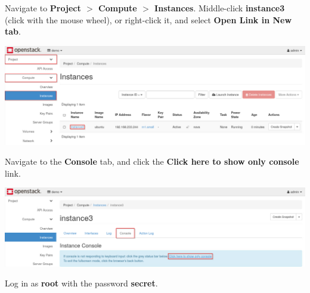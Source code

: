 \documentclass[letterpaper, 12pt]{article}
\begin{document}
\begin{enumerate}
    \begin{labstep}
        Navigate to \textbf{Project $>$ Compute $>$ Instances}.
        Middle-click \textbf{instance3} (click with the mouse wheel), or right-click it, and select \textbf{Open Link in New tab}.

        \begin{center}
            \includegraphics[width=\linewidth]{images/part5/step3.png}
        \end{center}
    \end{labstep}

    \begin{labstep}
        Navigate to the \textbf{Console} tab, and click the \textbf{Click here to show only console} link.

        \begin{center}
            \includegraphics[width=\linewidth]{images/part5/step4.png}
        \end{center}
    \end{labstep}

    \begin{labstep}
        Log in as \textbf{root} with the password \textbf{secret}.


\end{labstep}
\end{enumerate}
\end{document}
